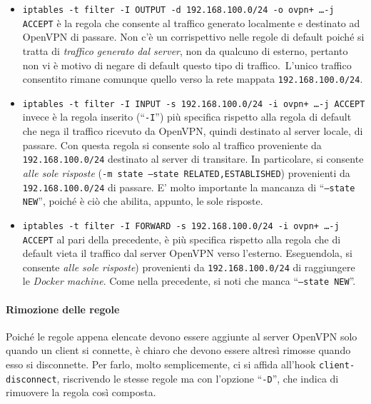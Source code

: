 		\begin{itemize}
			\item \texttt{iptables -t filter -I OUTPUT -d 192.168.100.0/24 -o ovpn+ \ldots -j ACCEPT}
			      è la regola che consente al traffico generato localmente e destinato ad OpenVPN
			      di passare. Non c'è un corrispettivo nelle regole di default poiché si tratta di
			      \textit{traffico generato dal server}, non da qualcuno di esterno, pertanto
			      non vi è motivo di negare di default questo tipo di traffico.\
			      L'unico traffico consentito rimane comunque quello verso la rete mappata
			      \texttt{192.168.100.0/24}.
			\item \texttt{iptables -t filter -I INPUT -s 192.168.100.0/24 -i ovpn+ \ldots -j ACCEPT}
			      invece è la regola inserito (``\texttt{-I}'') più specifica rispetto alla regola di default
			      che nega il traffico ricevuto da OpenVPN, quindi destinato al server locale, di passare.
			      Con questa regola si consente solo al traffico proveniente da \texttt{192.168.100.0/24}
			      destinato al server di transitare. In particolare, si consente \textit{alle sole risposte}
			      (\texttt{-m state --state RELATED,ESTABLISHED})
			      provenienti da \texttt{192.168.100.0/24}
			      di passare. E' molto importante la mancanza di ``\texttt{--state NEW}'',
			      poiché è ciò che abilita, appunto, le sole risposte.
			\item \texttt{iptables -t filter -I FORWARD -s 192.168.100.0/24 -i ovpn+ \ldots -j ACCEPT}
			      al pari della precedente, è più specifica rispetto alla regola che di default vieta il traffico
			      dal server OpenVPN verso l'esterno.
			      Eseguendola, si consente \textit{alle sole risposte})
			      provenienti da \texttt{192.168.100.0/24}
			      di raggiungere le \textit{Docker machine}. Come nella precedente, si noti che manca
			      ``\texttt{--state NEW}''.
		\end{itemize}
		
		
		\paragraph{Rimozione delle regole}
		Poiché le regole appena elencate devono essere aggiunte al server OpenVPN solo quando
		un client si connette, è chiaro che devono essere altresì rimosse quando esso si disconnette.
		Per farlo, molto semplicemente, ci si affida all'hook \texttt{client-disconnect}, riscrivendo
		le stesse regole ma con l'opzione ``\texttt{-D}'', che indica di rimuovere la regola così
		composta.
		

